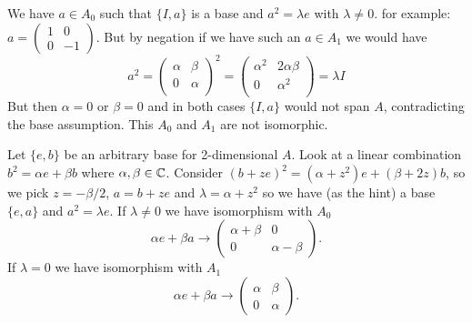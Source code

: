 \begin{enumerate}
We have \(a\in A_0\) such that \(\{I, a\}\) is a base and
\(a^2 = \lambda e\) with \(\lambda \neq 0\).
for example: \(a = \left(
\begin{smallmatrix}
1 & 0 \\
0 & -1
\end{smallmatrix}
\right)\).
But by negation if we have such an \(a\in A_1\) we would have
\begin{equation*}
a^2 =
\left(
\begin{array}{ll}
\alpha & \beta \\
0 & \alpha \\
\end{array}\right)^2 =
\left(
\begin{array}{ll}
\alpha^2 & 2\alpha\beta \\
0 & \alpha^2 \\
\end{array}\right) = \lambda I
\end{equation*}
But then \(\alpha=0\) or \(\beta=0\) and in both cases \(\{I, a\}\)
would not span $A$, contradicting the base assumption.
This \(A_0\) and \(A_1\) are not isomorphic.

Let \(\{e, b\}\) be an arbitrary base for 2-dimensional $A$.
Look at a linear combination \(b^2 = \alpha e + \beta b\)
where \(\alpha,\beta \in \mathbb{C}\).
Consider
\((b + ze)^2 = (\alpha + z^2) e + (\beta + 2z)b\),
so we pick \(z = -\beta/2\), \(a = b + ze\) and \(\lambda = \alpha + z^2\)
so we have (as the hint) a base \(\{e, a\}\) and \(a^2 = \lambda e\).
If \(\lambda \neq 0\) we have isomorphism with \(A_0\)
\begin{equation*}
  \alpha e + \beta a \to
  \left(
  \begin{array}{ll}
  \alpha + \beta & 0 \\
  0 & \alpha - \beta
  \end{array}
  \right).
\end{equation*}
If \(\lambda = 0\) we have isomorphism with \(A_1\)
\begin{equation*}
  \alpha e + \beta a \to
  \left(
  \begin{array}{ll}
  \alpha & \beta \\
  0 & \alpha
  \end{array}
  \right).
\end{equation*}


\end{enumerate}
